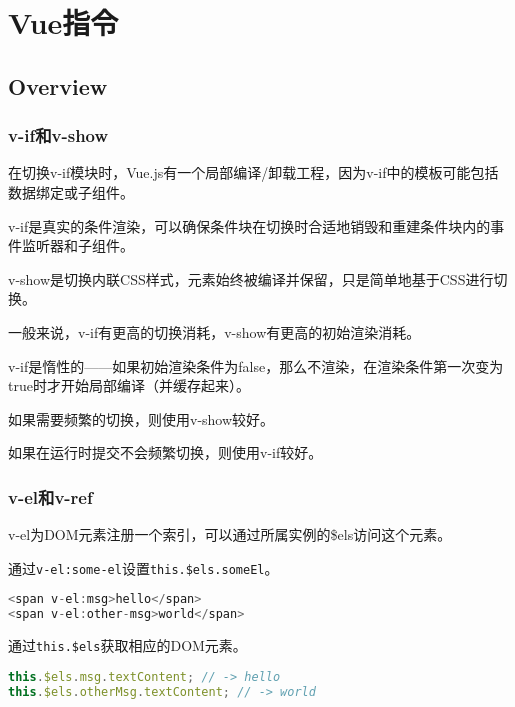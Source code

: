 \part{Vue指令}


\chapter{Overview}





\section{v-if和v-show}

在切换v-if模块时，Vue.js有一个局部编译/卸载工程，因为v-if中的模板可能包括数据绑定或子组件。

\begin{compactitem}
\item v-if是真实的条件渲染，可以确保条件块在切换时合适地销毁和重建条件块内的事件监听器和子组件。
\item v-show是切换内联CSS样式，元素始终被编译并保留，只是简单地基于CSS进行切换。
\end{compactitem}

一般来说，v-if有更高的切换消耗，v-show有更高的初始渲染消耗。

v-if是惰性的——如果初始渲染条件为false，那么不渲染，在渲染条件第一次变为true时才开始局部编译（并缓存起来）。

\begin{compactitem}
\item 如果需要频繁的切换，则使用v-show较好。
\item 如果在运行时提交不会频繁切换，则使用v-if较好。
\end{compactitem}

\section{v-el和v-ref}

v-el为DOM元素注册一个索引，可以通过所属实例的\$els访问这个元素。

\begin{compactitem}
\item 通过\texttt{v-el:some-el}设置\texttt{this.\$els.someEl}。


\begin{lstlisting}[language=JavaScript]
<span v-el:msg>hello</span>
<span v-el:other-msg>world</span>
\end{lstlisting}

\item 通过\texttt{this.\$els}获取相应的DOM元素。

\begin{lstlisting}[language=JavaScript]
this.$els.msg.textContent; // -> hello
this.$els.otherMsg.textContent; // -> world
\end{lstlisting}

\end{compactitem}

